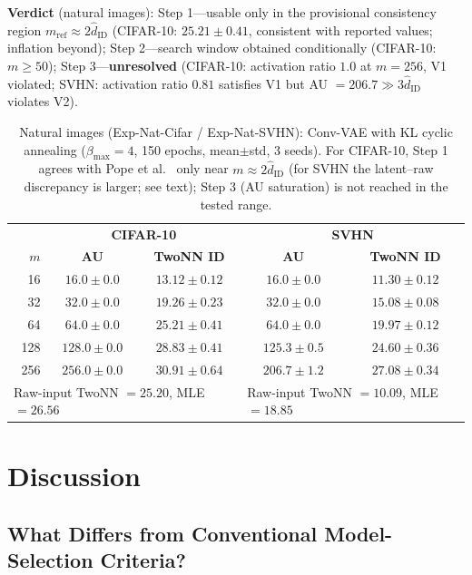 \documentclass[make,article,submit,pdftex,moreauthors]{Definitions/mdpi}
\newcommand{\hatdID}{\hat{d}_{\mathrm{ID}}}
\begin{document}
\textbf{Verdict} (natural images):
Step 1---usable only in the provisional consistency region
$m_{\mathrm{ref}} \approx 2\hatdID$
(CIFAR-10: $25.21 \pm 0.41$, consistent with reported values; inflation
beyond);
Step 2---search window obtained conditionally (CIFAR-10: $m \geq 50$);
Step 3---\textbf{unresolved} (CIFAR-10: activation ratio $1.0$ at $m = 256$,
V1 violated; SVHN: activation ratio $0.81$ satisfies V1 but
AU $= 206.7 \gg 3\hatdID$ violates V2).

\begin{table}[H]
\caption{Natural images (Exp-Nat-Cifar / Exp-Nat-SVHN): Conv-VAE with KL
cyclic annealing ($\beta_{\max} = 4$, 150 epochs, mean$\pm$std, 3 seeds).
For CIFAR-10, Step 1 agrees with Pope et al.~\cite{pope2021intrinsic} only
near $m \approx 2\hatdID$ (for SVHN the latent--raw discrepancy is larger;
see text); Step 3 (AU saturation) is not reached in the tested range.}
\label{tab:natural}
\small
\begin{tabular}{r cc | cc}
\toprule
 & \multicolumn{2}{c|}{\textbf{CIFAR-10}} & \multicolumn{2}{c}{\textbf{SVHN}} \\
$m$ & \textbf{AU} & \textbf{TwoNN ID} & \textbf{AU} & \textbf{TwoNN ID} \\
\midrule
 16 & $16.0 \pm 0.0$ & $13.12 \pm 0.12$ & $16.0 \pm 0.0$ & $11.30 \pm 0.12$ \\
 32 & $32.0 \pm 0.0$ & $19.26 \pm 0.23$ & $32.0 \pm 0.0$ & $15.08 \pm 0.08$ \\
 64 & $64.0 \pm 0.0$ & $\mathbf{25.21 \pm 0.41}$ & $64.0 \pm 0.0$ & $19.97 \pm 0.12$ \\
128 & $128.0 \pm 0.0$ & $28.83 \pm 0.41$ & $125.3 \pm 0.5$ & $24.60 \pm 0.36$ \\
256 & $256.0 \pm 0.0$ & $30.91 \pm 0.64$ & $206.7 \pm 1.2$ & $27.08 \pm 0.34$ \\
\midrule
\multicolumn{3}{l|}{Raw-input TwoNN $= 25.20$, MLE $= 26.56$} &
\multicolumn{2}{l}{Raw-input TwoNN $= 10.09$, MLE $= 18.85$} \\
\bottomrule
\end{tabular}
\end{table}

\section{Discussion}\label{sec:discussion}

\subsection{What Differs from Conventional Model-Selection Criteria?}\label{sec:disc_model_selection}
\end{document}
